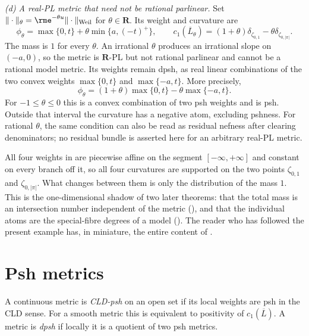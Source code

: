 \begin{example}
\emph{(d) A real-PL metric that need not be rational parlinear.}  Set
$\|\cdot\|_\theta=\rme^{-\theta u}\|\cdot\|_{\mathrm{Weil}}$ for
$\theta\in\mathbf R$.  Its weight and curvature are
\[
 \phi_\theta=\max\{0,t\}+\theta\min\{a,(-t)^+\},\qquad
 c_1(\overline L_\theta)
 =(1+\theta)\delta_{\zeta_{0,1}}
       -\theta\delta_{\zeta_{0,|\pi|}}.
\]
The mass is $1$ for every $\theta$.  An irrational $\theta$ produces
an irrational slope on $(-a,0)$, so the metric is $\mathbf R$-PL
but not rational parlinear and cannot be a rational model metric.
Its weights remain dpsh, as real linear combinations of the two convex
weights $\max\{0,t\}$ and $\max\{-a,t\}$.  More precisely,
\[
             \phi_\theta=(1+\theta)\max\{0,t\}
                              -\theta\max\{-a,t\}.
\]
For $-1\le\theta\le0$ this is a convex combination of two psh
weights and is psh.  Outside that interval the curvature has a
negative atom, excluding pshness.  For rational $\theta$, the same
condition can also be read as residual nefness after clearing
denominators; no residual bundle is asserted here for an arbitrary
real-PL metric.
\end{example}

\begin{remark}
\label{rem:ch17-four-computations}
All four weights in  are piecewise affine on
the segment $[-\infty,+\infty]$ and constant on every branch off it, so
all four curvatures are supported on the two points $\zeta_{0,1}$ and
$\zeta_{0,|\pi|}$.  What changes between them is only the distribution of
the mass $1$.  This is the one-dimensional shadow of two later theorems:
that the total mass is an intersection number independent of the metric
(), and that the individual atoms are the
special-fibre degrees of a model
().  The reader who has followed the
present example has, in miniature, the entire content of
.
\end{remark}

\section{Psh metrics}
\label{sec:ch17-psh}

\begin{definition}
\label{def:ch17-psh-metric}
A continuous metric is \emph{CLD-psh} on an open set if its local weights
are psh in the CLD sense.  For a smooth metric this is equivalent to
positivity of $c_1(\overline L)$.  A metric is \emph{dpsh} if locally it
is a quotient of two psh metrics.
\end{definition}

